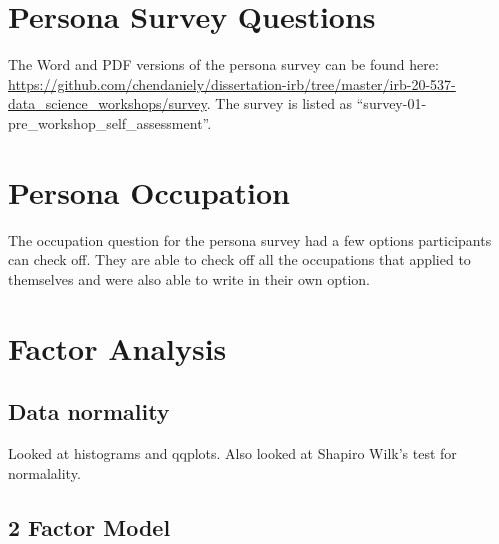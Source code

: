 \documentclass[../main.tex]{subfiles}
\begin{document}
    \section{Persona Survey Questions}

    The Word and PDF versions of the persona survey can be found here:
    \url{https://github.com/chendaniely/dissertation-irb/tree/master/irb-20-537-data\_science\_workshops/survey}.
    The survey is listed as ``survey-01-pre\_workshop\_self\_assessment''.

    \section{Persona Occupation}

        The occupation question for the persona survey had a few options participants can check off.
        They are able to check off all the occupations that applied to themselves and were also able to write in their own option.

    \section{Factor Analysis}

        \subsection{Data normality}
        \label{ss:fa-data-normality}

            Looked at histograms and qqplots.
            Also looked at Shapiro Wilk's test for normalality.



        \subsection{2 Factor Model}
\end{document}
